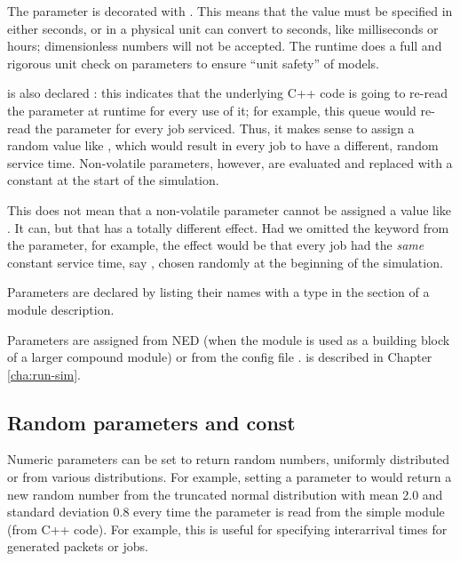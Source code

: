 The  parameter is decorated with . This means
that the value must be specified in either seconds, or in a physical unit {\opp}
can convert to seconds, like milliseconds or hours; dimensionless numbers
will not be accepted. The {\opp} runtime does a full and rigorous unit check on
parameters to ensure ``unit safety'' of models.

 is also declared : this indicates that the
underlying C++ code is going to re-read the parameter at runtime for every
use of it; for example, this queue would re-read the parameter for every job
serviced. Thus, it makes sense to assign  a random value like
, which would result in every job to have a different,
random service time. Non-volatile parameters, however, are evaluated and
replaced with a constant at the start of the simulation.

\begin{note}
    This does not mean that a non-volatile parameter cannot be assigned a value
    like . It can, but that has a totally different
    effect. Had we omitted the  keyword from the
     parameter, for example, the effect would be that every
    job had the \textit{same} constant service time, say ,
    chosen randomly at the beginning of the simulation.
\end{note}

Parameters are declared by listing their names with a type in the
 section of a module description.

Parameters are assigned from NED (when the module is used as a building block
of a larger compound module) or from the config file .
 is described in Chapter \ref{cha:run-sim}.


\subsection{Random parameters and const}
\label{sec:ch-ned-lang:const}

Numeric parameters can be set to return random numbers, uniformly
distributed or from various distributions. For example, setting a
parameter to  would return a new random number
from the truncated normal distribution with mean 2.0 and standard deviation 0.8
every time the parameter is read from the simple module (from C++ code).
For example, this is useful for specifying interarrival times for generated
packets or jobs.

